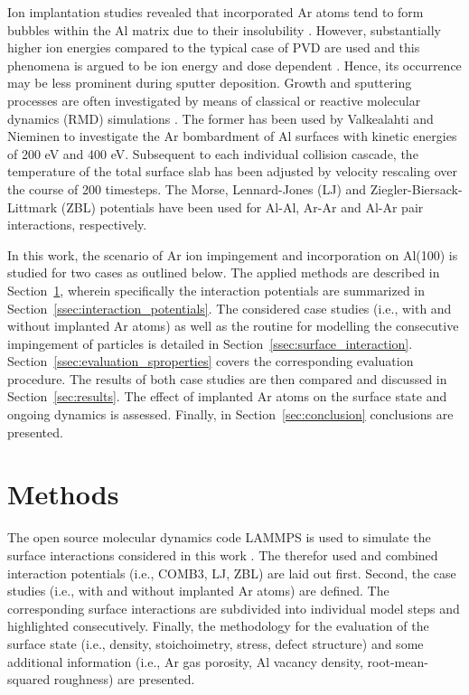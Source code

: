\documentclass[12pt,a4paper,preprint,superscriptaddress]{revtex4-1}
\begin{document}
Ion implantation studies revealed that incorporated Ar atoms tend to form bubbles within the Al matrix due to their insolubility \citep{vom1984pressure,tyagi1986solid,donnelly1986lattice,godet2018depth,dhaka2010plasmon,dhaka2008xe}. However, substantially higher ion energies compared to the typical case of PVD are used and this phenomena is argued to be ion energy and dose dependent \citep{biswas2004argon}. Hence, its occurrence may be less prominent during sputter deposition. Growth and sputtering processes are often investigated by means of classical or reactive molecular dynamics (RMD) simulations \citep{neyts2017molecular,graves2009molecular}. The former has been used by Valkealahti and Nieminen to investigate the Ar bombardment of Al surfaces with kinetic energies of 200 eV and 400 eV. Subsequent to each individual collision cascade, the temperature of the total surface slab has been adjusted by velocity rescaling over the course of 200 timesteps. The Morse, Lennard-Jones (LJ) and Ziegler-Biersack-Littmark (ZBL) potentials have been used for Al-Al, Ar-Ar and Al-Ar pair interactions, respectively. \citep{valkealahti1986molecular}

In this work, the scenario of Ar ion impingement and incorporation on Al(100) is studied for two cases as outlined below. The applied methods are described in Section~\ref{sec:methods}, wherein specifically the interaction potentials are summarized in Section~\ref{ssec:interaction_potentials}. The considered case studies (i.e., with and without implanted Ar atoms) as well as the routine for modelling the consecutive impingement of particles is detailed in Section~\ref{ssec:surface_interaction}. Section~\ref{ssec:evaluation_sproperties} covers the corresponding evaluation procedure. The results of both case studies are then compared and discussed in Section~\ref{sec:results}. The effect of implanted Ar atoms on the surface state and ongoing dynamics is assessed. Finally, in Section~\ref{sec:conclusion} conclusions are presented.

\section{Methods}
\label{sec:methods}

The open source molecular dynamics code LAMMPS is used to simulate the surface interactions considered in this work \citep{plimpton1995fast,thompson2022lammps}. The therefor used and combined interaction potentials (i.e., COMB3, LJ, ZBL) are laid out first. Second, the case studies (i.e., with and without implanted Ar atoms) are defined. The corresponding surface interactions are subdivided into individual model steps and highlighted consecutively. Finally, the methodology for the evaluation of the surface state (i.e., density, stoichoimetry, stress, defect structure) and some additional information (i.e., Ar gas porosity, Al vacancy density, root-mean-squared roughness) are presented.
\end{document}
